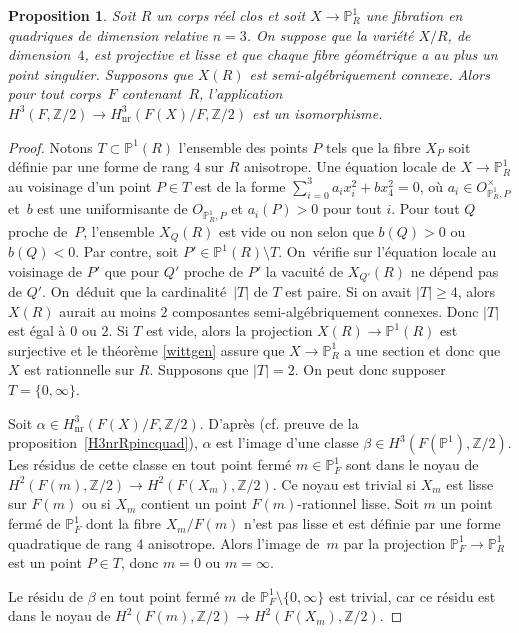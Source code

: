 \documentclass[11pt]{article}
\newcommand{\cf}{cf.\xspace}
\newtheorem{prop}[thm]{Proposition}
\theoremstyle{definition}
\newcommand{\Z}{\mathbb Z}
\renewcommand{\P}{\mathbb P}
\newcommand{\on}[1]{\operatorname{#1}}
\begin{document}
\begin{prop}\label{fibP1Rrel3}
Soit $R$ un corps réel clos et soit $X\to \P^1_{R}$ une fibration en quadriques de dimension relative $n= 3$.
On suppose que la variété $X/R$, de dimension~$4$, est projective et lisse
et que chaque fibre géométrique a au plus un point singulier. Supposons que $X(R)$ est semi-algébriquement connexe.
Alors pour tout corps~$F$ contenant~$R$,
l'application $H^3(F,\Z/2) \to H^3_{\on{nr}}(F(X)/F, \Z/2)$ est
un isomorphisme.
\end{prop}
\begin{proof}

Notons $T\subset \P^1(R)$ l'ensemble des points $P$ tels que la fibre $X_P$ soit définie par une forme de rang $4$ sur $R$ anisotrope. Une équation locale de $X\to \P^1_R$ au voisinage d'un point $P\in T$ est de la forme $\sum_{i=0}^3 a_ix_i^2+bx_4^2=0$, où $a_i\in O_{\P^1_R,P}^\times$ et~$b$ est une uniformisante de $O_{\P^1_R,P}$ et $a_i(P)>0$ pour tout $i$.
Pour tout $Q$ proche de~$P$, l'ensemble $X_Q(R)$ est vide ou non selon que $b(Q)>0$ ou $b(Q)<0$. Par contre, soit $P'\in \P^1(R)\setminus T$. On~vérifie sur l'équation locale au voisinage de $P'$ que pour $Q'$ proche de $P'$ la vacuité de $X_{Q'}(R)$ ne dépend pas de $Q'$. On~déduit que la cardinalité~$|T|$ de $T$ est paire. Si on avait $|T|\geq 4$, alors $X(R)$ aurait au moins $2$ composantes semi-algébriquement connexes. Donc $|T|$ est égal à $0$ ou $2$. Si $T$ est vide, alors la projection $X(R) \to \P^1(R)$ est surjective
et le théorème \ref{wittgen} assure que $X \to \P^1_{R}$ a une section
et donc que $X$ est rationnelle sur $R$.
Supposons que $|T|=2$.
On peut donc supposer $T=\{0,\infty\}$.

Soit $\alpha \in H^3_{\on{nr}}(F(X)/F, \Z/2)$. D'après \cite[Th.\,5]{kahn1998unramified} (\cf preuve de la proposition~\ref{H3nrRpincquad}),
$\alpha$ est l'image d'une classe $\beta \in H^3(F(\P^1),\Z/2)$.
Les résidus de cette classe en tout point fermé $m \in \P^1_{F}$
sont dans le noyau de $H^2(F(m), \Z/2) \to H^2(F(X_{m}), \Z/2)$.
Ce noyau est trivial si $X_{m}$ est lisse sur $F(m)$ ou si $X_m$ contient un point
$F(m)$\nobreakdash-rationnel lisse. Soit $m$ un point fermé de $\P^1_{F}$
dont la fibre $X_{m}/F(m)$ n'est pas lisse et est définie par
une forme quadratique de rang $4$ anisotrope.
Alors l'image de~$m$ par la projection $\P^1_{F}\to \P^1_{R}$ est
un point $P\in T$, donc $m=0$ ou $m=\infty$.

Le résidu de $\beta$ en tout point fermé $m$ de $\P^1_{F}\setminus \{0,\infty\}$ est trivial, car ce résidu est
dans le noyau de $H^2(F(m),\Z/2) \to H^2(F(X_{m}),\Z/2)$.


\end{proof}
\end{document}
